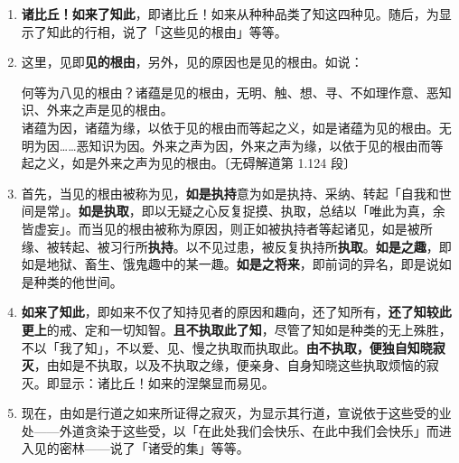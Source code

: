 \begin{enumerate}\item \textbf{诸比丘！如来了知此}，即诸比丘！如来从种种品类了知这四种见。随后，为显示了知此的行相，说了「这些见的根由」等等。
\item 这里，见即\textbf{见的根由}，另外，见的原因也是见的根由。如说：\begin{quoting}何等为八见的根由？诸蕴是见的根由，无明、触、想、寻、不如理作意、恶知识、外来之声是见的根由。\\诸蕴为因，诸蕴为缘，以依于见的根由而等起之义，如是诸蕴为见的根由。无明为因……恶知识为因。外来之声为因，外来之声为缘，以依于见的根由而等起之义，如是外来之声为见的根由。{\bluefootnotesize 〔无碍解道第 1.124 段〕}\end{quoting}
\item 首先，当见的根由被称为见，\textbf{如是执持}意为如是执持、采纳、转起「自我和世间是常」。\textbf{如是执取}，即以无疑之心反复捉摸、执取，总结以「唯此为真，余皆虚妄」。而当见的根由被称为原因，则正如被执持者等起诸见，如是被所缘、被转起、被习行所\textbf{执持}。以不见过患，被反复执持所\textbf{执取}。\textbf{如是之趣}，即如是地狱、畜生、饿鬼趣中的某一趣。\textbf{如是之将来}，即前词的异名，即是说如是种类的他世间。
\item \textbf{如来了知此}，即如来不仅了知持见者的原因和趣向，还了知所有，\textbf{还了知较此更上}的戒、定和一切知智。\textbf{且不执取此了知}，尽管了知如是种类的无上殊胜，不以「我了知」，不以爱、见、慢之执取而执取此。\textbf{由不执取，便独自知晓寂灭}，由如是不执取，以及不执取之缘，便亲身、自身知晓这些执取烦恼的寂灭。即显示：诸比丘！如来的涅槃显而易见。
\item 现在，由如是行道之如来所证得之寂灭，为显示其行道，宣说依于这些受的业处——外道贪染于这些受，以「在此处我们会快乐、在此中我们会快乐」而进入见的密林——说了「诸受的集」等等。

\end{enumerate}
